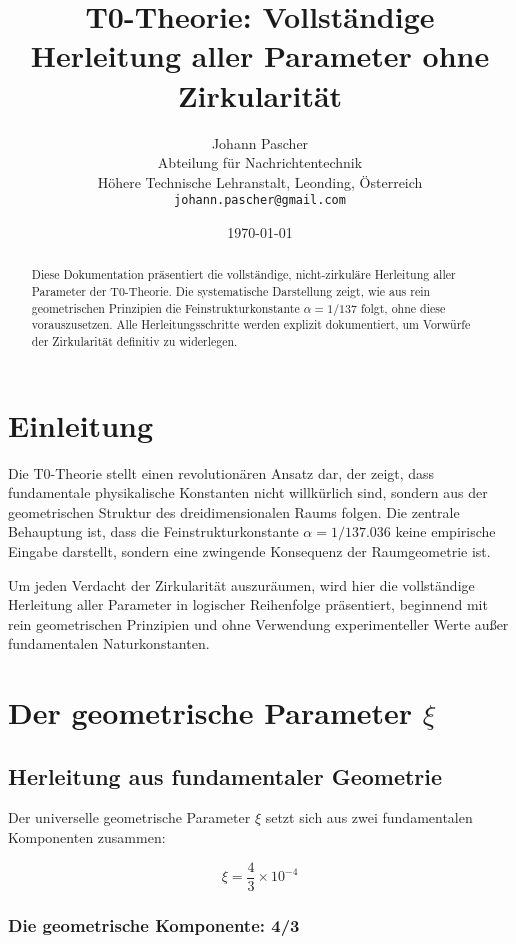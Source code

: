 \documentclass[12pt,a4paper]{article}
\title{T0-Theorie: Vollst\"andige Herleitung aller Parameter ohne Zirkularit\"at}
\author{Johann Pascher\\
	Abteilung f\"ur Nachrichtentechnik\\
	H\"ohere Technische Lehranstalt, Leonding, \"Osterreich\\
	\texttt{johann.pascher@gmail.com}}
\date{\today}
\theoremstyle{definition}
\begin{document}
	
	\maketitle
	
	\begin{abstract}
		Diese Dokumentation pr\"asentiert die vollst\"andige, nicht-zirkul\"are Herleitung aller Parameter der T0-Theorie. Die systematische Darstellung zeigt, wie aus rein geometrischen Prinzipien die Feinstrukturkonstante $\alpha = 1/137$ folgt, ohne diese vorauszusetzen. Alle Herleitungsschritte werden explizit dokumentiert, um Vorw\"urfe der Zirkularit\"at definitiv zu widerlegen.
	\end{abstract}
	
	\section{Einleitung}
	
	Die T0-Theorie stellt einen revolution\"aren Ansatz dar, der zeigt, dass fundamentale physikalische Konstanten nicht willk\"urlich sind, sondern aus der geometrischen Struktur des dreidimensionalen Raums folgen. Die zentrale Behauptung ist, dass die Feinstrukturkonstante $\alpha = 1/137.036$ keine empirische Eingabe darstellt, sondern eine zwingende Konsequenz der Raumgeometrie ist.
	
	Um jeden Verdacht der Zirkularit\"at auszur\"aumen, wird hier die vollst\"andige Herleitung aller Parameter in logischer Reihenfolge pr\"asentiert, beginnend mit rein geometrischen Prinzipien und ohne Verwendung experimenteller Werte au\ss er fundamentalen Naturkonstanten.
\tableofcontents
\newpage	
\section{Der geometrische Parameter $\xi$}

\subsection{Herleitung aus fundamentaler Geometrie}

Der universelle geometrische Parameter $\xi$ setzt sich aus zwei fundamentalen Komponenten zusammen:

\begin{equation}
	\xi = \frac{4}{3} \times 10^{-4}
\end{equation}

\subsubsection{Die geometrische Komponente: 4/3}
\end{document}

